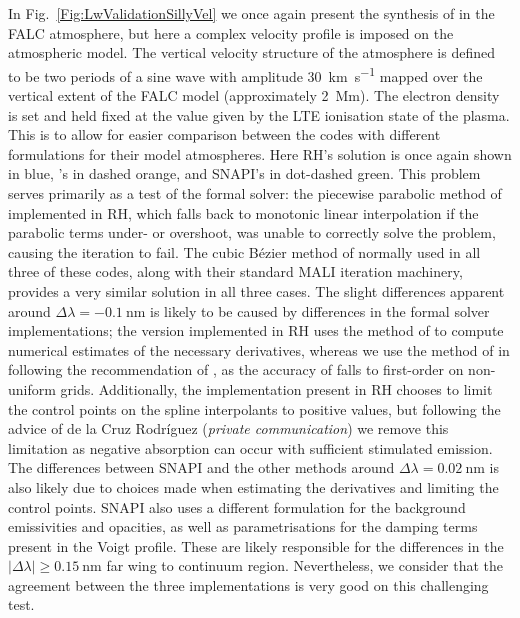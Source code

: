 In Fig.~\ref{Fig:LwValidationSillyVel} we once again present the synthesis of \CaLine{} in the FALC atmosphere, but here a complex velocity profile is imposed on the atmospheric model.
The vertical velocity structure of the atmosphere is defined to be two periods of a sine wave with amplitude \SI{30}{\kilo\metre\per\second} mapped over the vertical extent of the FALC model (approximately \SI{2}{\mega\metre}).
The electron density is set and held fixed at the value given by the LTE ionisation state of the plasma.
This is to allow for easier comparison between the codes with different formulations for their model atmospheres.
Here RH's solution is once again shown in blue, \Lw{}'s in dashed orange, and SNAPI's in dot-dashed green.
This problem serves primarily as a test of the formal solver: the piecewise parabolic method of \citet{Auer1994} implemented in RH, which falls back to monotonic linear interpolation if the parabolic terms under- or overshoot, was unable to correctly solve the problem, causing the iteration to fail.
The cubic Bézier method of \citet{DelaCruzRodriguez2013} normally used in all three of these codes, along with their standard MALI iteration machinery, provides a very similar solution in all three cases.
The slight differences apparent around $\Delta\lambda=\SI{-0.1}{\nano\metre}$ is likely to be caused by differences in the formal solver implementations; the version implemented in RH uses the method of \citet{Fritsch1984} to compute numerical estimates of the necessary derivatives, whereas we use the method of \citet{Steffen1990} in \Lw{} following the recommendation of \citet{Janett2018}, as the accuracy of \citet{Fritsch1984} falls to first-order on non-uniform grids.
Additionally, the implementation present in RH chooses to limit the control points on the spline interpolants to positive values, but following the advice of de la Cruz Rodríguez (\emph{private communication}) we remove this limitation as negative absorption can occur with sufficient stimulated emission.
The differences between SNAPI and the other methods around $\Delta\lambda=\SI{0.02}{\nano\metre}$ is also likely due to choices made when estimating the derivatives and limiting the control points.
SNAPI also uses a different formulation for the background emissivities and opacities, as well as parametrisations for the damping terms present in the Voigt profile.
These are likely responsible for the differences in the $|\Delta\lambda| \geq \SI{0.15}{\nano\metre}$ far wing to continuum region.
Nevertheless, we consider that the agreement between the three implementations is very good on this challenging test.


